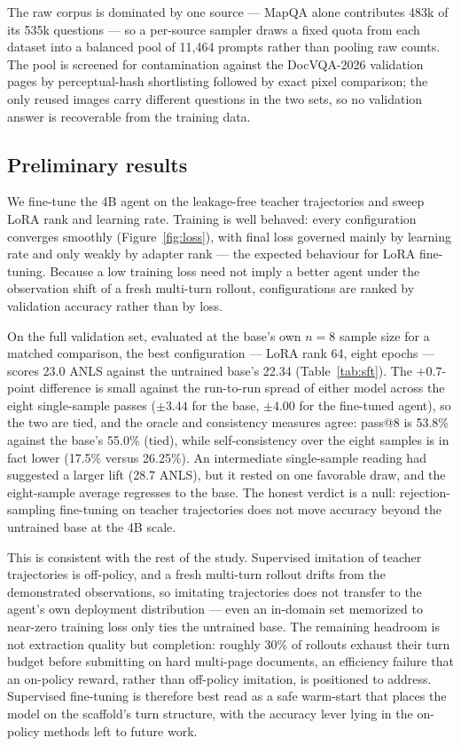 The raw corpus is dominated by one source --- MapQA alone contributes 483k of its 535k questions --- so a per-source sampler draws a fixed quota from each dataset into a balanced pool of 11{,}464 prompts rather than pooling raw counts. The pool is screened for contamination against the DocVQA-2026 validation pages by perceptual-hash shortlisting followed by exact pixel comparison; the only reused images carry different questions in the two sets, so no validation answer is recoverable from the training data.

\subsection{Preliminary results}
\label{sec:prelim}

We fine-tune the 4B agent on the leakage-free teacher trajectories and sweep LoRA rank and learning rate. Training is well behaved: every configuration converges smoothly (Figure~\ref{fig:loss}), with final loss governed mainly by learning rate and only weakly by adapter rank --- the expected behaviour for LoRA fine-tuning. Because a low training loss need not imply a better agent under the observation shift of a fresh multi-turn rollout, configurations are ranked by validation accuracy rather than by loss.

On the full validation set, evaluated at the base's own $n{=}8$ sample size for a matched comparison, the best configuration --- LoRA rank 64, eight epochs --- scores 23.0 ANLS against the untrained base's 22.34 (Table~\ref{tab:sft}). The $+0.7$-point difference is small against the run-to-run spread of either model across the eight single-sample passes ($\pm 3.44$ for the base, $\pm 4.00$ for the fine-tuned agent), so the two are tied, and the oracle and consistency measures agree: pass@8 is 53.8\% against the base's 55.0\% (tied), while self-consistency over the eight samples is in fact lower (17.5\% versus 26.25\%). An intermediate single-sample reading had suggested a larger lift (28.7 ANLS), but it rested on one favorable draw, and the eight-sample average regresses to the base. The honest verdict is a null: rejection-sampling fine-tuning on teacher trajectories does not move accuracy beyond the untrained base at the 4B scale.

This is consistent with the rest of the study. Supervised imitation of teacher trajectories is off-policy, and a fresh multi-turn rollout drifts from the demonstrated observations, so imitating trajectories does not transfer to the agent's own deployment distribution --- even an in-domain set memorized to near-zero training loss only ties the untrained base. The remaining headroom is not extraction quality but completion: roughly 30\% of rollouts exhaust their turn budget before submitting on hard multi-page documents, an efficiency failure that an on-policy reward, rather than off-policy imitation, is positioned to address. Supervised fine-tuning is therefore best read as a safe warm-start that places the model on the scaffold's turn structure, with the accuracy lever lying in the on-policy methods left to future work.

